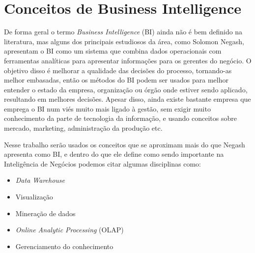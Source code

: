 \chapter{Conceitos de Business Intelligence}\label{cap_trabalho_academico}


De forma geral o termo \textit{Business Intelligence} (BI) ainda não é bem definido na literatura, mas alguns dos principais estudiosos da área, como Solomon Negash, apresentam o BI como um sistema que combina dados operacionais com ferramentas analíticas para apresentar informações para os gerentes do negócio. O objetivo disso é melhorar a qualidade das decisões do processo, tornando-as melhor embasadas, então os métodos do BI podem ser usados para melhor entender o estado da empresa, organização ou órgão onde estiver sendo aplicado, resultando em melhores decisões. Apesar disso, ainda existe bastante empresa que emprega o BI num viés muito mais ligado à gestão, sem exigir muito conhecimento da parte de tecnologia da informação, e usando conceitos sobre mercado, marketing, administração da produção etc. 

Nesse trabalho serão usados os conceitos que se aproximam mais do que Negash apresenta como BI, e dentro do que ele define como sendo importante na Inteligência de Negócios podemos citar algumas disciplinas como:

\begin{itemize}
	\item \textit{Data Warehouse}
	\item Visualização
	\item Mineração de dados
	\item \textit{Online Analytic Processing} (OLAP)
	\item Gerenciamento do conhecimento
\end{itemize}

